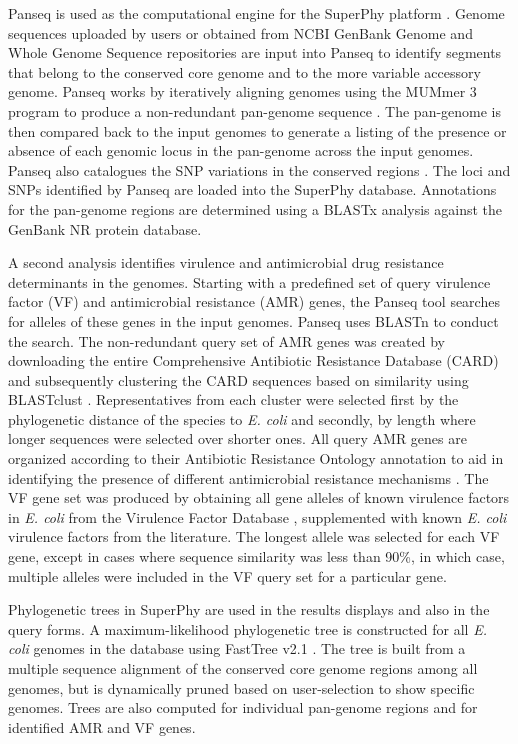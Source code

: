 \documentclass[a4paper,twoside]{article}
\begin{document}
Panseq is used as the computational engine for the SuperPhy platform \cite{laing_pan-genome_2010}. Genome sequences uploaded by users or obtained from NCBI GenBank Genome and Whole Genome Sequence repositories \cite{benson2013genbank} are input into Panseq to identify segments that belong to the conserved core genome and to the more variable accessory genome. Panseq works by iteratively aligning genomes using the MUMmer 3 program to produce a non-redundant pan-genome sequence \cite{laing_pan-genome_2010,kurtz2004versatile}. The pan-genome is then compared back to the input genomes to generate a listing of the presence or absence of each genomic locus in the pan-genome across the input genomes. Panseq also catalogues the SNP variations in the conserved regions \cite{laing_pan-genome_2010}.  The loci and SNPs identified by Panseq are loaded into the SuperPhy database. Annotations for the pan-genome regions are determined using a BLASTx analysis against the GenBank NR protein database.

A second analysis identifies virulence and antimicrobial drug resistance determinants in the genomes. Starting with a predefined set of query virulence factor (VF) and antimicrobial resistance (AMR) genes, the Panseq tool searches for alleles of these genes in the input genomes. Panseq uses BLASTn to conduct the search. The non-redundant query set of AMR genes was created by downloading the entire Comprehensive Antibiotic Resistance Database (CARD) \cite{mcarthur2012card} and subsequently clustering the CARD sequences based on similarity using BLASTclust \cite{altschul_gapped_1997}. Representatives from each cluster were selected first by the phylogenetic distance of the species to \textit{E. coli} and secondly, by length where longer sequences were selected over shorter ones. All query AMR genes are organized according to their Antibiotic Resistance Ontology annotation to aid in identifying the presence of different antimicrobial resistance mechanisms \cite{antezana_biological_2009}. The VF gene set was produced by obtaining all gene alleles of known virulence factors in \textit{E. coli} from the Virulence Factor Database \cite{chen2012vfdb,chen2005vfdb}, supplemented with known \textit{E. coli} virulence factors from the literature.  The longest allele was selected for each VF gene, except in cases where sequence similarity was less than 90\%, in which case, multiple alleles were included in the VF query set for a particular gene.

Phylogenetic trees in SuperPhy are used in the results displays and also in the query forms. A maximum-likelihood phylogenetic tree is constructed for all \textit{E. coli} genomes in the database using FastTree v2.1 \cite{price_fasttree_2010}. The tree is built from a multiple sequence alignment of the conserved core genome regions among all genomes, but is dynamically pruned based on user-selection to show specific genomes. Trees are also computed for individual pan-genome regions and for identified AMR and VF genes.
\end{document}
